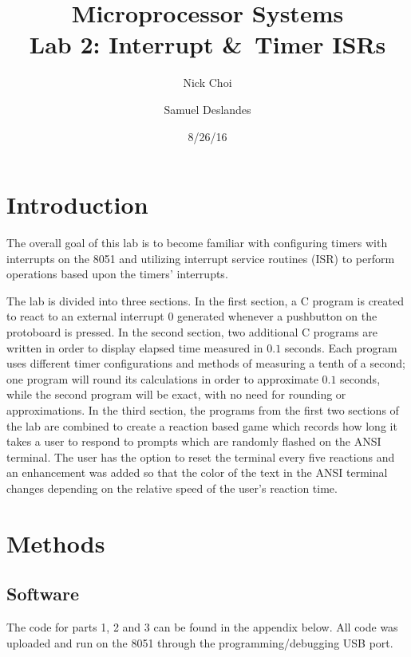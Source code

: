 \documentclass[12pt]{article}
\begin{document}
\title{Microprocessor Systems\\ Lab 2: Interrupt \&\ Timer ISRs}
\author{Nick Choi \and Samuel Deslandes}
\date{8/26/16}
\maketitle
\pagebreak
\section{Introduction}
The overall goal of this lab is to become familiar with configuring timers with interrupts on the 8051 and utilizing interrupt service routines (ISR) to perform operations based upon the timers’ interrupts. 

The lab is divided into three sections. In the first section, a C program is created to react to an external interrupt 0 generated whenever a pushbutton on the protoboard is pressed. In the second section, two additional C programs are written in order to display elapsed time measured in $0.1$ seconds. Each program uses different timer configurations and methods of measuring a tenth of a second; one program will round its calculations in order to approximate $0.1$ seconds, while the second program will be exact, with no need for rounding or approximations. In the third section, the programs from the first two sections of the lab are combined to create a reaction based game which records how long it takes a user to respond to prompts which are randomly flashed on the ANSI terminal. The user has the option to reset the terminal every five reactions and an enhancement was added so that the color of the text in the ANSI terminal changes depending on the relative speed of the user's reaction time. 
 

\section{Methods}
\subsection{Software}
The code for parts 1, 2 and 3 can be found in the appendix below. All code was uploaded and run on the 8051 through the programming/debugging USB port. 	
\end{document}
